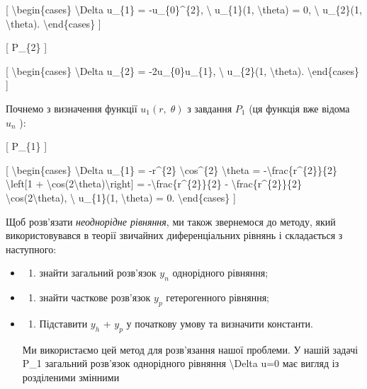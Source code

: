 \documentclass[
]{article}
\providecommand{\tightlist}{%
  \setlength{\itemsep}{0pt}\setlength{\parskip}{0pt}}
\begin{document}
{[} \textbackslash begin\{cases\} \textbackslash Delta u\_\{1\} =
-u\_\{0\}\^{}\{2\}, \textbackslash{} u\_\{1\}(1, \textbackslash theta) =
0, \textbackslash{} u\_\{2\}(1, \textbackslash theta).
\textbackslash end\{cases\} {]}

{[} P\_\{2\} {]}

{[} \textbackslash begin\{cases\} \textbackslash Delta u\_\{2\} =
-2u\_\{0\}u\_\{1\}, \textbackslash{} u\_\{2\}(1, \textbackslash theta).
\textbackslash end\{cases\} {]}

Почнемо з визначення функції \(u_1\left(r,\;\theta\right)\) з завдання
\(P_1\) (ця функція вже відома \(u_n\) ):

{[} P\_\{1\} {]}

{[} \textbackslash begin\{cases\} \textbackslash Delta u\_\{1\} =
-r\^{}\{2\} \textbackslash cos\^{}\{2\} \textbackslash theta =
-\textbackslash frac\{r\^{}\{2\}\}\{2\} \textbackslash left{[}1 +
\textbackslash cos(2\textbackslash theta)\textbackslash right{]} =
-\textbackslash frac\{r\^{}\{2\}\}\{2\} -
\textbackslash frac\{r\^{}\{2\}\}\{2\}
\textbackslash cos(2\textbackslash theta), \textbackslash{} u\_\{1\}(1,
\textbackslash theta) = 0. \textbackslash end\{cases\} {]}

Щоб розв'язати \emph{неоднорідне рівняння}, ми також звернемося до
методу, який використовувався в теорії звичайних диференціальних рівнянь
і складається з наступного:

\begin{itemize}
\item
  \begin{enumerate}
  \def\labelenumi{\arabic{enumi})}
  \tightlist
  \item
    знайти загальний розв'язок \(y_n\) однорідного рівняння;
  \end{enumerate}
\item
  \begin{enumerate}
  \def\labelenumi{\arabic{enumi})}
  \setcounter{enumi}{1}
  \tightlist
  \item
    знайти часткове розв'язок \(y_p\) гетерогенного рівняння;
  \end{enumerate}
\item
  \begin{enumerate}
  \def\labelenumi{\arabic{enumi})}
  \setcounter{enumi}{2}
  \tightlist
  \item
    Підставити \(y_h\) + \(y_p\) у початкову умову та визначити
    константи.
  \end{enumerate}

  Ми використаємо цей метод для розв'язання нашої проблеми. У нашій
  задачі P\_1 загальний розв'язок однорідного рівняння
  \textbackslash Delta u=0 має вигляд із розділеними змінними
\end{itemize}
\end{document}
